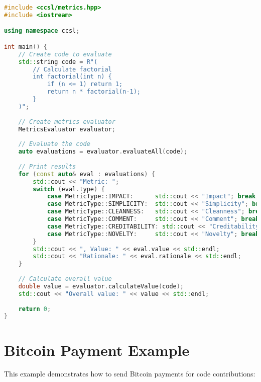\documentclass[11pt,a4paper]{report}
\begin{document}
\begin{lstlisting}[language=C++]
#include <ccsl/metrics.hpp>
#include <iostream>

using namespace ccsl;

int main() {
    // Create code to evaluate
    std::string code = R"(
        // Calculate factorial
        int factorial(int n) {
            if (n <= 1) return 1;
            return n * factorial(n-1);
        }
    )";
    
    // Create metrics evaluator
    MetricsEvaluator evaluator;
    
    // Evaluate the code
    auto evaluations = evaluator.evaluateAll(code);
    
    // Print results
    for (const auto& eval : evaluations) {
        std::cout << "Metric: ";
        switch (eval.type) {
            case MetricType::IMPACT:      std::cout << "Impact"; break;
            case MetricType::SIMPLICITY:  std::cout << "Simplicity"; break;
            case MetricType::CLEANNESS:   std::cout << "Cleanness"; break;
            case MetricType::COMMENT:     std::cout << "Comment"; break;
            case MetricType::CREDITABILITY: std::cout << "Creditability"; break;
            case MetricType::NOVELTY:     std::cout << "Novelty"; break;
        }
        std::cout << ", Value: " << eval.value << std::endl;
        std::cout << "Rationale: " << eval.rationale << std::endl;
    }
    
    // Calculate overall value
    double value = evaluator.calculateValue(code);
    std::cout << "Overall value: " << value << std::endl;
    
    return 0;
}
\end{lstlisting}

\section{Bitcoin Payment Example}

This example demonstrates how to send Bitcoin payments for code contributions:
\end{document}
